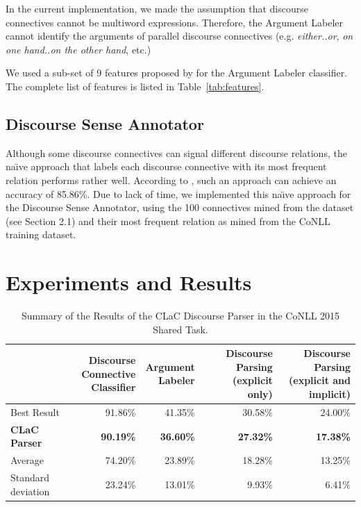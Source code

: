 \documentclass[11pt]{article}
\begin{document}
In the current implementation, we made the assumption that discourse connectives cannot be multiword expressions. Therefore, the Argument Labeler cannot identify the arguments of parallel discourse connectives (e.g. \textit{either..or}, \textit{on one hand..on the other hand}, etc.)

We used a sub-set of 9 features proposed by  for the Argument Labeler classifier. The complete list of features is listed in Table~\ref{tab:features}.

\subsection{Discourse Sense Annotator} 
Although some discourse connectives can signal different discourse relations, the na\"\i ve approach that labels each discourse connective with its most frequent relation performs rather well. According to , such an approach can achieve an accuracy of 85.86\%. Due to lack of time, we implemented this na\"\i ve approach for the Discourse Sense Annotator, using the 100 connectives mined from the dataset (see Section 2.1) and their most frequent relation as mined from the CoNLL training dataset.  

\section{Experiments and Results}
\label{sec:experiments}

\begin{table}[!htb]
\centering
\begin{tabular}{|l|r|r|r|r|}
\hline
                      & \parbox{.12\textwidth}{\textbf{Discourse \\ Connective \\ Classifier}} & \parbox{.11\textwidth}{\textbf{Argument \\ Labeler}} & \parbox{.2\textwidth}{\textbf{Discourse Parsing \\ (explicit only)}} & \parbox{.2\textwidth}{\textbf{Discourse Parsing \\ (explicit and  \\ implicit)}} \\ \hline
Best Result           & 91.86\%      & 41.35\%          & 30.58\%         & 24.00\%  \\
\textbf{CLaC Parser}           & \textbf{90.19\%}          & \textbf{36.60\%}          & \textbf{27.32\%}        & \textbf{17.38\%} \\
Average               & 74.20\%          & 23.89\%          & 18.28\%        & 13.25\% \\ \hline
Standard deviation    & 23.24\%          & 13.01\%          & 9.93\%         & 6.41\% 
\\ \hline
\end{tabular}
\caption{Summary of the Results of the CLaC Discourse Parser in the CoNLL 2015 Shared Task.}

\label{tab:overall}
\end{table}
\end{document}
